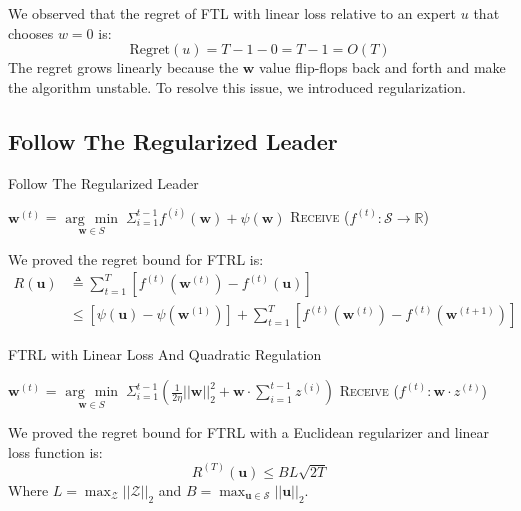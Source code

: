 \documentclass[11pt]{article}
\newcommand{\argmin}[1]{\underset{#1}{\operatorname{arg}\,\operatorname{min}}\;}
\begin{document}
We observed that the regret of FTL with linear loss relative to an expert $u$ that chooses $w=0$ is:
\begin{equation*}
    \text{Regret}(u) = T-1-0 = T-1 = O(T)
\end{equation*}
The regret grows linearly because the $\bm{w}$ value flip-flops back and forth and make the algorithm unstable. To resolve this issue, we introduced regularization.

\subsection{Follow The Regularized Leader}
\begin{algorithm}
  \caption{Follow The Regularized Leader}\label{euclid}
  \begin{algorithmic}[1]
        \State $\bm{w}^{(t)}$ = $\argmin{\bm{w} \in S} \Sigma^{t-1}_{i=1} f^{(i)} (\bm{w}) + \psi(\bm{w})$
        \State \textsc{Receive} ($f^{(t)} : \mathcal{S} \rightarrow \mathbb{R}$)
    \EndFor
    \EndFunction
  \end{algorithmic}
\end{algorithm}
We proved the regret bound for FTRL is:
\begin{align*}
    R(\bm{u}) &\triangleq \sum_{t=1}^{T} \left[ f^{(t)}(\bm{w}^{(t)}) - f^{(t)}(\bm{u}) \right]\\
    & \leq \left[ \psi(\bm{u}) - \psi(\bm{w}^{(1)}) \right] +  \sum_{t=1}^{T} \left[ f^{(t)}(\bm{w}^{(t)}) - f^{(t)}(\bm{w}^{(t+1)}) \right]
\end{align*}

\begin{algorithm}[h]
  \caption{FTRL with Linear Loss And Quadratic Regulation}\label{euclid}
  \begin{algorithmic}[1]
        \State $\bm{w}^{(t)}$ = $\argmin{\bm{w} \in S} \Sigma^{t-1}_{i=1} \left( \frac{1}{2\eta} ||\bm{w}||^2_2 + \bm{w} \cdot \sum_{i=1}^{t-1} z^{(i)} \right)$
        \State \textsc{Receive} ($f^{(t)} : \bm{w} \cdot z^{(t)}$)
    \EndFor
    \EndFunction
  \end{algorithmic}
\end{algorithm}
We proved the regret bound for FTRL with a Euclidean regularizer and linear loss function is:
\begin{equation*}
    \label{eqn:ftrl_regret_bound_euclidean}
    R^{(T)}(\bm{u}) \leq BL\sqrt{2T}
\end{equation*}
Where $L = \max_\mathcal{Z} || \mathcal{Z} ||_2$ and $B = \max_{\bm{u} \in \mathcal{S}} || \bm{u} ||_2$.
\end{document}
